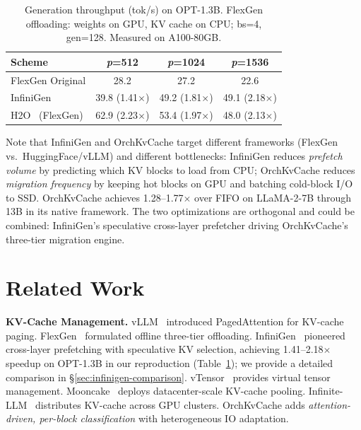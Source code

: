 \documentclass[conference]{IEEEtran}
\begin{document}
\begin{table}[t]
\centering
\caption{Generation throughput (tok/s) on OPT-1.3B.  FlexGen offloading: weights on GPU, KV cache on CPU; bs=4, gen=128.  Measured on A100-80GB.}
\label{tab:infinigen-throughput}
\small
\begin{tabular}{@{}lccc@{}}
\toprule
Scheme & \textit{p}=512 & \textit{p}=1024 & \textit{p}=1536 \\
\midrule
FlexGen Original          & 28.2              & 27.2              & 22.6 \\
InfiniGen~\cite{infinigen} & 39.8 (1.41$\times$) & 49.2 (1.81$\times$) & 49.1 (2.18$\times$) \\
H2O~\cite{h2o} (FlexGen)  & 62.9 (2.23$\times$) & 53.4 (1.97$\times$) & 48.0 (2.13$\times$) \\
\bottomrule
\end{tabular}
\end{table}

Note that InfiniGen and OrchKvCache target different frameworks (FlexGen vs.\ HuggingFace/vLLM) and different bottlenecks: InfiniGen reduces \emph{prefetch volume} by predicting which KV blocks to load from CPU; OrchKvCache reduces \emph{migration frequency} by keeping hot blocks on GPU and batching cold-block I/O to SSD.  OrchKvCache achieves 1.28--1.77$\times$ over FIFO on LLaMA-2-7B through 13B in its native framework.  The two optimizations are orthogonal and could be combined: InfiniGen's speculative cross-layer prefetcher driving OrchKvCache's three-tier migration engine.

\section{Related Work}

\textbf{KV-Cache Management.} vLLM~\cite{vllm} introduced PagedAttention for KV-cache paging. FlexGen~\cite{flexgen} formulated offline three-tier offloading. InfiniGen~\cite{infinigen} pioneered cross-layer prefetching with speculative KV selection, achieving 1.41--2.18$\times$ speedup on OPT-1.3B in our reproduction (Table~\ref{tab:infinigen-throughput}); we provide a detailed comparison in \S\ref{sec:infinigen-comparison}. vTensor~\cite{vtensor} provides virtual tensor management. Mooncake~\cite{mooncake} deploys datacenter-scale KV-cache pooling. Infinite-LLM~\cite{infinitellm} distributes KV-cache across GPU clusters. OrchKvCache adds \emph{attention-driven, per-block classification} with heterogeneous IO adaptation.
\end{document}
